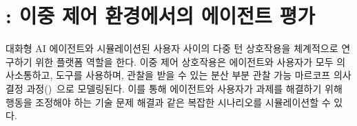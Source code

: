 \section{\bench: 이중 제어 환경에서의 에이전트 평가}
\label{sec:methods}

 대화형 AI 에이전트와 시뮬레이션된 사용자 사이의 다중 턴 상호작용을 체계적으로 연구하기 위한 플랫폼 역할을 한다. %
이중 제어 상호작용은 에이전트와 사용자가 모두 의사소통하고, 도구를 사용하며, 관찰을 받을 수 있는 분산 부분 관찰 가능 마르코프 의사결정 과정(\decpomdp)~\cite{oliehoek2016concise}으로 모델링된다. 이를 통해 에이전트와 사용자가 과제를 해결하기 위해 행동을 조정해야 하는 기술 문제 해결과 같은 복잡한 시나리오를 시뮬레이션할 수 있다.



